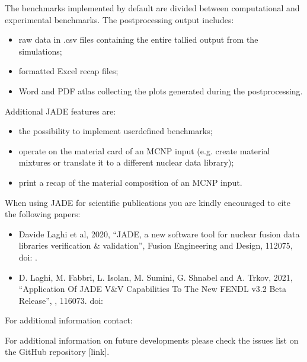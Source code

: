 \documentclass[letterpaper,10pt,english]{sphinxmanual}
\begin{document}
The benchmarks implemented by default are divided between computational
and experimental benchmarks. The post\sphinxhyphen{}processing output includes:
\begin{itemize}
\item {} 
raw data in .csv files containing the entire tallied output from the
simulations;

\item {} 
formatted Excel recap files;

\item {} 
Word and PDF atlas collecting the plots generated during the post\sphinxhyphen{}processing.

\end{itemize}

Additional JADE features are:
\begin{itemize}
\item {} 
the possibility to implement user\sphinxhyphen{}defined benchmarks;

\item {} 
operate on the material card of an MCNP input (e.g. create material mixtures
or translate it to a different nuclear data library);

\item {} 
print a recap of the material composition of an MCNP input.

\end{itemize}

When using JADE for scientific publications you are kindly encouraged to cite the following papers:
\begin{itemize}
\item {} 
Davide Laghi et al, 2020, “JADE, a new software tool for nuclear fusion data libraries verification \& validation”,
Fusion Engineering and Design,  112075, doi: .

\item {} 
D. Laghi, M. Fabbri, L. Isolan, M. Sumini, G. Shnabel and A. Trkov, 2021,
“Application Of JADE V\&V Capabilities To The New FENDL v3.2 Beta Release”,
,  116073. doi: 

\end{itemize}

For additional information contact: 

For additional information on future developments please check the issues list on the
GitHub repository {[}link{]}.
\end{document}
